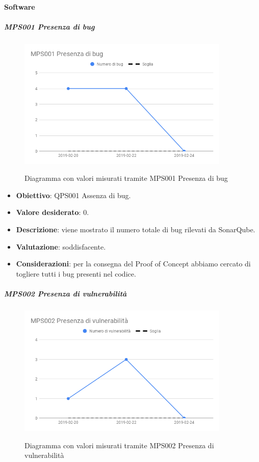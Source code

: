 	\paragraph{Software}

	\subparagraph{MPS001 Presenza di bug}
    
    \begin{figure}[H]
        \centering
        \includegraphics[width=0.9\textwidth]{img/cruscotti/MPS001.png}
        \label{immaginePresenzaBug}
        \caption{Diagramma con valori misurati tramite MPS001 Presenza di bug}
    \end{figure}
    
    \begin{itemize}
        \item \textbf{Obiettivo}: QPS001 Assenza di bug.
        \item \textbf{Valore desiderato}: 0.
        \item \textbf{Descrizione}: viene mostrato il numero totale di bug rilevati da SonarQube.
        \item \textbf{Valutazione}: soddisfacente.
        \item \textbf{Considerazioni}: per la consegna del Proof of Concept abbiamo cercato di togliere tutti i bug presenti nel codice.
    \end{itemize}

    \subparagraph{MPS002 Presenza di vulnerabilità}
    
    \begin{figure}[H]
        \centering
        \includegraphics[width=0.9\textwidth]{img/cruscotti/MPS002.png}
        \label{immaginePresenzaVulnerabilità}
        \caption{Diagramma con valori misurati tramite MPS002 Presenza di vulnerabilità}
    \end{figure}
    
